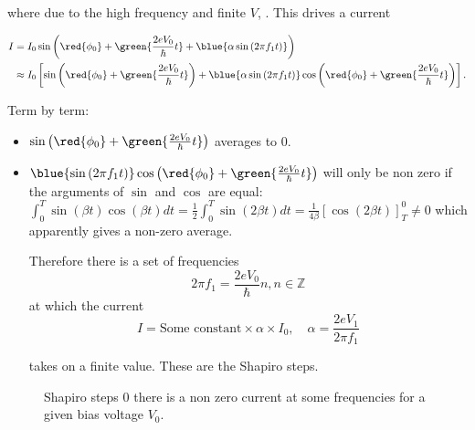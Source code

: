 \noindent   where  due   to   the  high   frequency   and  finite   $V$,
.  This drives a current

\begin{equation}
  \begin{aligned}
    I & = I_0\sin\left(\red{\phi_0} + \green{\frac{2eV_0}{\hbar}t} +
      \blue{\alpha\sin\left( 2\pi f_1 t \right)} \right) \\
    &       \approx       I_0      \left[       \sin\left(\red{\phi_0}       +
        \green{\frac{2eV_0}{\hbar}t}\right)  +  \blue{\alpha\sin\left(  2\pi
          f_1       t       \right)}\cos      \left(\red{\phi_0}       +
        \green{\frac{2eV_0}{\hbar}t} \right) \right].
  \end{aligned}
\end{equation}

\noindent Term by term:

\begin{itemize}
\item    $\sin\left(\red{\phi_0}   +    \green{\frac{2eV_0}{\hbar}t}\right)$
  averages to 0.
\item
  $\blue{\sin\left(  2\pi   f_1  t  \right)}\cos   \left(\red{\phi_0}  +
    \green{\frac{2eV_0}{\hbar}t}  \right)$  will only  be  non  zero if  the
  arguments      of      $\sin$      and     $\cos$      are      equal:
  $\int_0^T\sin(\beta t)\cos(\beta t)dt  = \frac{1}{2}\int_0^{T}\sin(2\beta t)dt
  =  \frac{1}{4\beta}\left[ \cos(2\beta  t)  \right]_T^0 \ne  0 $  which
  apparently gives a non-zero average.

  \begin{framed}\noindent
    Therefore there is a set of frequencies
    \begin{equation}
      2\pi f_{1} = \frac{2eV_{0}}{\hbar}n, n \in \mathbb{Z}
    \end{equation}
    at which the current
    \begin{equation}
      I = \text{Some constant} \times \alpha \times I_0, \quad \alpha = \frac{2eV_{1}}{2\pi  f_1}
    \end{equation}

    \noindent takes on a finite value. These are the Shapiro steps.
  \end{framed}
\end{itemize}

\begin{figure}[h]
  \centering {}
  \caption{\small Shapiro  steps 0 there is  a non zero current  at some
    frequencies       for        a       given        bias       voltage
    $V_0$. \label{fig:jj_shapiro_step_at_frequency}}
\end{figure}


